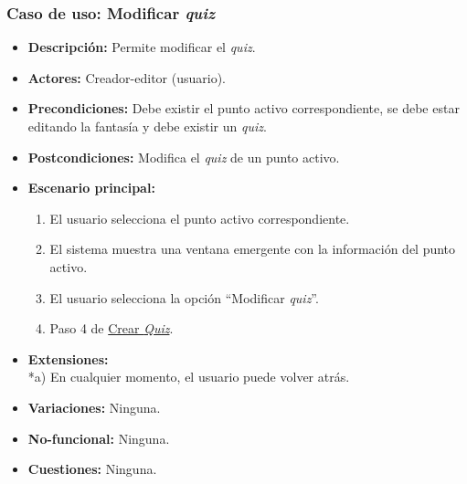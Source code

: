 \subsubsection{Caso de uso: Modificar \textit{quiz}}
\begin{itemize}
	\item \textbf{Descripción:} Permite modificar el \textit{quiz}.
	\item \textbf{Actores:} Creador-editor (usuario).
	\item \textbf{Precondiciones:} Debe existir el punto activo correspondiente, se debe estar editando la fantasía y debe existir un \textit{quiz}.
	\item \textbf{Postcondiciones:} Modifica el \textit{quiz} de un punto activo.
	\item \textbf{Escenario principal:}
	\begin{enumerate}
		\item El usuario selecciona el punto activo correspondiente.
		\item El sistema muestra una ventana emergente con la información del punto activo.
		\item El usuario selecciona la opción ``Modificar \textit{quiz}''.
		\item Paso 4 de \hyperlink{crearquiz}{Crear \textit{Quiz}}.
	\end{enumerate}
	\item \textbf{Extensiones:} \\ *a) En cualquier momento, el usuario puede volver atrás.
	\item \textbf{Variaciones:} Ninguna.
	\item \textbf{No-funcional:} Ninguna.
	\item \textbf{Cuestiones:} Ninguna.
\end{itemize}

